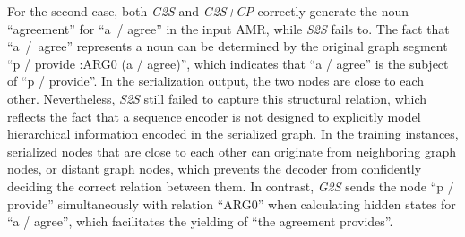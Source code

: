 \documentclass[11pt,a4paper]{article}
\begin{document}
For the second case, both \emph{G2S} and \emph{G2S+CP} correctly generate the noun ``agreement'' for ``a~/ agree'' in the input AMR, while \emph{S2S} fails to.
The fact that ``a~/~agree'' represents a noun can be determined by the original graph segment ``p / provide :ARG0 (a / agree)'', which indicates that ``a / agree'' is the subject of ``p / provide''.
In the serialization output, the two nodes are close to each other.
Nevertheless, \emph{S2S} still failed to capture this structural relation, which reflects the fact that a sequence encoder is not designed to explicitly model hierarchical information encoded in the serialized graph.
In the training instances, serialized nodes that are close to each other can originate from neighboring graph nodes, or distant graph nodes, which prevents the decoder from confidently deciding the correct relation between them.
In contrast, \emph{G2S} sends the node ``p / provide'' simultaneously with relation ``ARG0'' when calculating hidden states for ``a / agree'', which facilitates the yielding of ``the agreement provides''.
\end{document}
